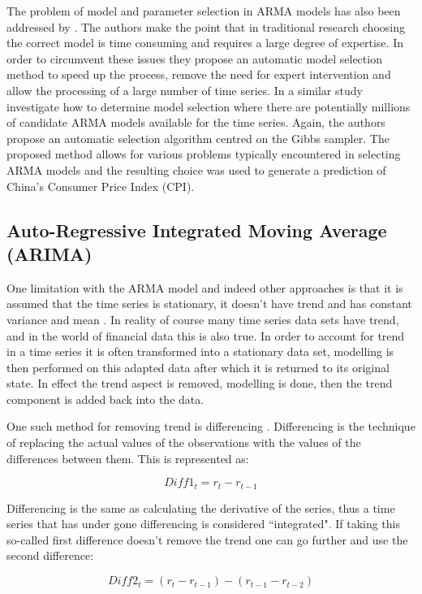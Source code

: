 The problem of model and parameter selection in ARMA models has also been addressed by \cite{Rojas2008519}. The authors make the point that in traditional research choosing the correct model is time consuming and requires a large degree of expertise. In order to circumvent these issues they propose an automatic model selection method to speed up the process, remove the need for expert intervention and allow the processing of a large number of time series. In a similar study \cite{Qian20076180} investigate how to determine model selection where there are potentially millions of candidate ARMA models available for the time series. Again, the authors propose an automatic selection algorithm centred on the Gibbs sampler. The proposed method allows for various problems typically encountered in selecting ARMA models and the resulting choice was used to generate a prediction of China’s Consumer Price Index (CPI).

\subsection{Auto-Regressive Integrated Moving Average (ARIMA)}
\label{sec:arima}
One limitation with the ARMA model and indeed other approaches is that it is assumed that the time series is stationary, it doesn't have trend and has constant variance and mean \citep{shumway2010time}. In reality of course many time series data sets have trend, and in the world of financial data this is also true. In order to account for trend in a time series it is often transformed into a stationary data set, modelling is then performed on this adapted data after which it is returned to its original state. In effect the trend aspect is removed, modelling is done, then the trend component is added back into the data.

One such method for removing trend is differencing \citep{mills2011}. Differencing is the technique of replacing the actual values of the observations with the values of the differences between them. This is represented as:

\[ Diff1_{t}=r_{t}-r_{t-1} \]

Differencing is the same as calculating the derivative of the series, thus a time series that has under gone differencing is considered \textquotedblleft integrated". If taking this so-called first difference doesn't remove the trend one can go further and use the second difference:

\[ Diff2_{t}=(r_{t}-r_{t-1})-(r_{t-1}-r_{t-2}) \]

